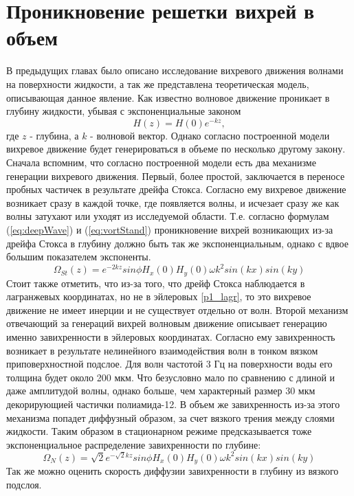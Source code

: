 \chapter{Проникновение решетки вихрей в объем} \label{chapt6}

В предыдущих главах было описано исследование вихревого движения волнами на поверхности жидкости, а так же представлена теоретическая модель, описывающая данное явление. Как известно \cite{land} волновое движение проникает в глубину жидкости, убывая с экспоненциальные законом 
\begin{equation}
 \label{eq:deepWave}
H(z) = H(0) e^{-kz},
\end{equation}
 где $z$ - глубина, а $k$ - волновой вектор. Однако согласно построенной модели вихревое движение будет генерироваться в объеме по несколько другому закону. Сначала вспомним, что согласно построенной модели есть два механизме генерации вихревого движения. 
	Первый, более простой, заключается в переносе пробных частичек в результате дрейфа Стокса. Согласно ему вихревое движение возникает сразу в каждой точке, где появляется волны, и исчезает сразу же как волны затухают или уходят из исследуемой области. Т.е. согласно формулам (\ref{eq:deepWave}) и (\ref{eq:vortStand}) проникновение вихрей возникающих из-за дрейфа Стокса в глубину должно быть так же экспоненциальным, однако с вдвое большим показателем экспоненты.
\begin{equation}
 \label{eq:deepStocks}
\Omega_{St}(z)  = e^{-2kz} sin \phi H_x(0) H_y(0) \omega k^2 sin(kx)sin(ky)
\end{equation}
Стоит также отметить, что из-за того, что дрейф Стокса наблюдается в лагранжевых координатах, но не в эйлеровых \ref{p1_lagr}, то это вихревое движение не имеет инерции и не существует отдельно от волн.
	Второй механизм отвечающий за генераций вихрей волновым движение описывает генерацию именно завихренности в эйлеровых координатах. Согласно ему завихренность возникает в результате нелинейного взаимодействия волн в тонком вязком приповерхностной подслое. Для волн частотой 3 Гц на поверхности воды его толщина будет около  200 мкм. Что безусловно мало по сравнению с длиной и даже амплитудой волны, однако больше, чем характерный размер 30 мкм декорирующией частички полиамида-12. В объем же завихренность из-за этого механизма попадет диффузный образом, за счет вязкого трения между слоями жидкости. Таким образом в стационарном режиме предсказывается тоже экспоненциальное распределение завихренности по глубине:
\begin{equation}
 \label{eq:deepEyler}
\Omega_N(z)  = \sqrt{2}e^{-\sqrt{2}kz} sin \phi H_x(0) H_y(0) \omega k^2 sin(kx)sin(ky)
\end{equation}
Так же можно оценить скорость диффузии завихренности в глубину из вязкого подслоя. 

